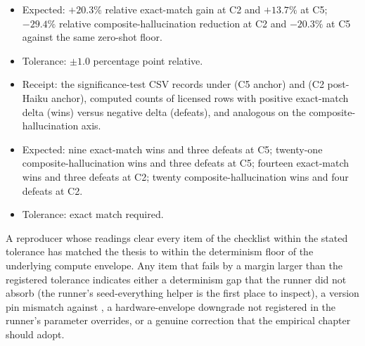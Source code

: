 \begin{description}[style=nextline,leftmargin=0pt]
\begin{itemize}
\item Expected: $+20.3\%$ relative exact-match gain at C2 and $+13.7\%$ at C5; $-29.4\%$ relative composite-hallucination reduction at C2 and $-20.3\%$ at C5 against the same zero-shot floor.
\item Tolerance: $\pm 1.0$ percentage point relative.
\end{itemize}
\item[Significance-panel win/loss tallies at C2 and C5 (post-Haiku).]
\begin{itemize}
\item Receipt: the significance-test CSV records under  (C5 anchor) and  (C2 post-Haiku anchor), computed counts of licensed rows with positive exact-match delta (wins) versus negative delta (defeats), and analogous on the composite-hallucination axis.
\item Expected: nine exact-match wins and three defeats at C5; twenty-one composite-hallucination wins and three defeats at C5; fourteen exact-match wins and three defeats at C2; twenty composite-hallucination wins and four defeats at C2.
\item Tolerance: exact match required.
\end{itemize}
\end{description}

A reproducer whose readings clear every item of the checklist within the stated tolerance has matched the thesis to within the determinism floor of the underlying compute envelope. Any item that fails by a margin larger than the registered tolerance indicates either a determinism gap that the runner did not absorb (the runner's seed-everything helper is the first place to inspect), a version pin mismatch against , a hardware-envelope downgrade not registered in the runner's parameter overrides, or a genuine correction that the empirical chapter should adopt.
